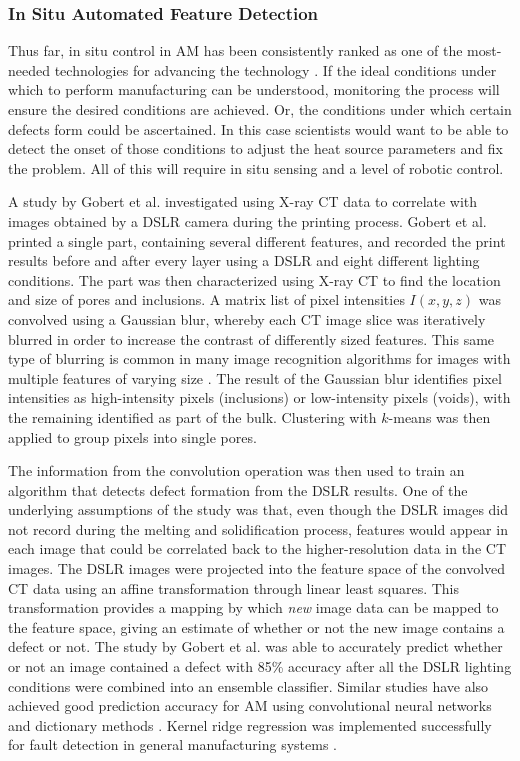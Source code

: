 \subsubsection{In Situ Automated Feature Detection}
Thus far, in situ control in AM has been consistently ranked as one of the most-needed technologies for advancing the technology \cite{Mani2017, Tapia2014}. If the ideal conditions under which to perform manufacturing can be understood, monitoring the process will ensure the desired conditions are achieved. Or, the conditions under which certain defects form could be ascertained. In this case scientists would want to be able to detect the onset of those conditions to adjust the heat source parameters and fix the problem. All of this will require in situ sensing and a level of robotic control. 

A study by Gobert et al. investigated using X-ray CT data to correlate with images obtained by a DSLR camera during the printing process. Gobert et al. printed a single part, containing several different features, and recorded the print results before and after every layer using a DSLR and eight different lighting conditions. The part was then characterized using X-ray CT to find the location and size of pores and inclusions. A matrix list of pixel intensities $I(x,y,z)$ was convolved using a Gaussian blur, whereby each CT image slice was iteratively blurred in order to increase the contrast of differently sized features. This same type of blurring is common in many image recognition algorithms for images with multiple features of varying size \cite{Lowe2004, Bay2008}. The result of the Gaussian blur identifies pixel intensities as high-intensity pixels (inclusions) or low-intensity pixels (voids), with the remaining identified as part of the bulk. Clustering with $k$-means was then applied to group pixels into single pores.

The information from the convolution operation was then used to train an algorithm that detects defect formation from the DSLR results. One of the underlying assumptions of the study was that, even though the DSLR images did not record during the melting and solidification process, features would appear in each image that could be correlated back to the higher-resolution data in the CT images. The DSLR images were projected into the feature space of the convolved CT data using an affine transformation through linear least squares. This transformation provides a mapping by which \textit{new} image data can be mapped to the feature space, giving an estimate of whether or not the new image contains a defect or not. The study by Gobert et al. was able to accurately predict whether or not an image contained a defect with 85\% accuracy after all the DSLR lighting conditions were combined into an ensemble classifier. Similar studies have also achieved good prediction accuracy for AM using convolutional neural networks \cite{Scime2018} and dictionary methods \cite{Abdelrahman2017}. Kernel ridge regression was implemented successfully for fault detection in general manufacturing systems \cite{Wang2018}.

